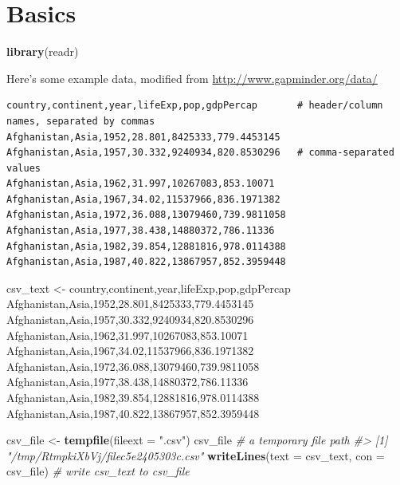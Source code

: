 \documentclass[
]{report}
\newenvironment{Shaded}{\begin{snugshade}}{\end{snugshade}}
\newcommand{\CommentTok}[1]{\textcolor[rgb]{0.56,0.35,0.01}{\textit{#1}}}
\newcommand{\DataTypeTok}[1]{\textcolor[rgb]{0.13,0.29,0.53}{#1}}
\newcommand{\KeywordTok}[1]{\textcolor[rgb]{0.13,0.29,0.53}{\textbf{#1}}}
\newcommand{\NormalTok}[1]{#1}
\newcommand{\StringTok}[1]{\textcolor[rgb]{0.31,0.60,0.02}{#1}}
\begin{document}
\hypertarget{basics}{%
\section{Basics}\label{basics}}

\begin{Shaded}
\begin{Highlighting}[]
\KeywordTok{library}\NormalTok{(readr)}
\end{Highlighting}
\end{Shaded}

Here's some example data, modified from \url{http://www.gapminder.org/data/}

\begin{verbatim}
country,continent,year,lifeExp,pop,gdpPercap       # header/column names, separated by commas
Afghanistan,Asia,1952,28.801,8425333,779.4453145
Afghanistan,Asia,1957,30.332,9240934,820.8530296   # comma-separated values
Afghanistan,Asia,1962,31.997,10267083,853.10071
Afghanistan,Asia,1967,34.02,11537966,836.1971382
Afghanistan,Asia,1972,36.088,13079460,739.9811058
Afghanistan,Asia,1977,38.438,14880372,786.11336
Afghanistan,Asia,1982,39.854,12881816,978.0114388
Afghanistan,Asia,1987,40.822,13867957,852.3959448
\end{verbatim}

\begin{Shaded}
\begin{Highlighting}[]
\NormalTok{csv\_text \textless{}{-}}\StringTok{ }
\StringTok{\textquotesingle{}country,continent,year,lifeExp,pop,gdpPercap     }
\StringTok{Afghanistan,Asia,1952,28.801,8425333,779.4453145}
\StringTok{Afghanistan,Asia,1957,30.332,9240934,820.8530296}
\StringTok{Afghanistan,Asia,1962,31.997,10267083,853.10071}
\StringTok{Afghanistan,Asia,1967,34.02,11537966,836.1971382}
\StringTok{Afghanistan,Asia,1972,36.088,13079460,739.9811058}
\StringTok{Afghanistan,Asia,1977,38.438,14880372,786.11336}
\StringTok{Afghanistan,Asia,1982,39.854,12881816,978.0114388}
\StringTok{Afghanistan,Asia,1987,40.822,13867957,852.3959448\textquotesingle{}}

\NormalTok{csv\_file \textless{}{-}}\StringTok{ }\KeywordTok{tempfile}\NormalTok{(}\DataTypeTok{fileext =} \StringTok{".csv"}\NormalTok{)      }
\NormalTok{csv\_file }\CommentTok{\# a temporary file path}
\CommentTok{\#\textgreater{} [1] "/tmp/RtmpkiXbVj/filec5e2405303c.csv"}
\KeywordTok{writeLines}\NormalTok{(}\DataTypeTok{text =}\NormalTok{ csv\_text, }\DataTypeTok{con =}\NormalTok{ csv\_file) }\CommentTok{\# write \textasciigrave{}csv\_text\textasciigrave{} to \textasciigrave{}csv\_file\textasciigrave{}}
\end{Highlighting}
\end{Shaded}
\end{document}
